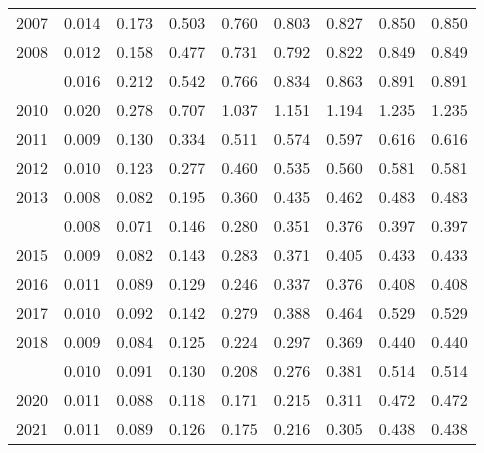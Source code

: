 \documentclass[
]{article}
\begin{document}
\begin{longtable}[t]{lrrrrrrrr}
2007 & 0.014 & 0.173 & 0.503 & 0.760 & 0.803 & 0.827 & 0.850 & 0.850\\
2008 & 0.012 & 0.158 & 0.477 & 0.731 & 0.792 & 0.822 & 0.849 & 0.849\\
\addlinespace
2009 & 0.016 & 0.212 & 0.542 & 0.766 & 0.834 & 0.863 & 0.891 & 0.891\\
2010 & 0.020 & 0.278 & 0.707 & 1.037 & 1.151 & 1.194 & 1.235 & 1.235\\
2011 & 0.009 & 0.130 & 0.334 & 0.511 & 0.574 & 0.597 & 0.616 & 0.616\\
2012 & 0.010 & 0.123 & 0.277 & 0.460 & 0.535 & 0.560 & 0.581 & 0.581\\
2013 & 0.008 & 0.082 & 0.195 & 0.360 & 0.435 & 0.462 & 0.483 & 0.483\\
\addlinespace
2014 & 0.008 & 0.071 & 0.146 & 0.280 & 0.351 & 0.376 & 0.397 & 0.397\\
2015 & 0.009 & 0.082 & 0.143 & 0.283 & 0.371 & 0.405 & 0.433 & 0.433\\
2016 & 0.011 & 0.089 & 0.129 & 0.246 & 0.337 & 0.376 & 0.408 & 0.408\\
2017 & 0.010 & 0.092 & 0.142 & 0.279 & 0.388 & 0.464 & 0.529 & 0.529\\
2018 & 0.009 & 0.084 & 0.125 & 0.224 & 0.297 & 0.369 & 0.440 & 0.440\\
\addlinespace
2019 & 0.010 & 0.091 & 0.130 & 0.208 & 0.276 & 0.381 & 0.514 & 0.514\\
2020 & 0.011 & 0.088 & 0.118 & 0.171 & 0.215 & 0.311 & 0.472 & 0.472\\
2021 & 0.011 & 0.089 & 0.126 & 0.175 & 0.216 & 0.305 & 0.438 & 0.438\\*
\end{longtable}
\end{document}
